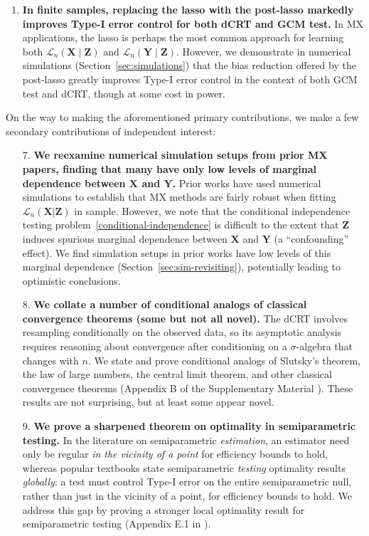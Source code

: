 \documentclass[aos]{imsart}
\theoremstyle{plain}
\theoremstyle{remark}
\newcommand{\prx}{\bm X}								%
\newcommand{\prz}{\bm Z}								%
\newcommand{\pry}{{\bm Y}}								%
\newcommand{\law}{\mathcal L}							%
\begin{document}
\begin{enumerate}
	\item \textbf{In finite samples, replacing the lasso with the post-lasso markedly improves Type-I error control for both dCRT and GCM test.} In MX applications, the lasso is perhaps the most common approach for learning both $\law_n(\prx \mid \prz)$ and $\law_n(\pry \mid \prz)$. However, we demonstrate in numerical simulations (Section~\ref{sec:simulations}) that the bias reduction offered by the post-lasso greatly improves Type-I error control in the context of both GCM test and dCRT, though at some cost in power. 
\end{enumerate}

On the way to making the aforementioned primary contributions, we make a few secondary contributions of independent interest:

\begin{enumerate}
	\item[7.] \textbf{We reexamine numerical simulation setups from prior MX papers, finding that many have only low levels of marginal dependence between $\prx$ and $\pry$.} Prior works have used numerical simulations to establish that MX methods are fairly robust when fitting $\mathcal L_n(\prx|\prz)$ in sample. However, we note that the conditional independence testing problem~\eqref{conditional-independence} is difficult to the extent that $\prz$ induces spurious marginal dependence between $\prx$ and $\pry$ (a ``confounding'' effect). We find simulation setups in prior works have low levels of this marginal dependence (Section~\ref{sec:sim-revisiting}), potentially leading to optimistic conclusions.
	
	\item[8.] \textbf{We collate a number of conditional analogs of classical convergence theorems (some but not all novel).} The dCRT involves resampling conditionally on the observed data, so its asymptotic analysis requires reasoning about convergence after conditioning on a $\sigma$-algebra that changes with $n$. We state and prove conditional analogs of Slutsky's theorem, the law of large numbers, the central limit theorem, and other classical convergence theorems (Appendix B of the Supplementary Material \citep{supplementary}). These results are not surprising, but at least some appear novel.
	
	\item[9.] \textbf{We prove a sharpened theorem on optimality in semiparametric testing.} In the literature on semiparametric \textit{estimation}, an estimator need only be regular \textit{in the vicinity of a point} for efficiency bounds to hold, whereas popular textbooks \citep{VDV1998, Kosorok2008} state semiparametric \textit{testing} optimality results \textit{globally}: a test must control Type-I error on the entire semiparametric null, rather than just in the vicinity of a point, for efficiency bounds to hold. We address this gap by proving a stronger local optimality result for semiparametric testing (Appendix E.1 in \cite{supplementary}).
\end{enumerate}
\end{document}
